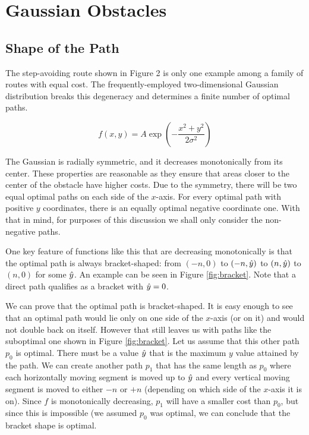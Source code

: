 \section{Gaussian Obstacles}
\subsection{Shape of the Path}
The step-avoiding route shown in Figure 2 is only one example among a family of routes with equal cost. The frequently-employed two-dimensional Gaussian distribution 
breaks this degeneracy and determines a finite number of optimal paths.


\begin{equation}
f(x, y) = A \exp\left(-\displaystyle\frac{x^2+y^2}{2\sigma^2}\right)
\end{equation}

The Gaussian is radially symmetric, and it decreases monotonically from its center. These properties are reasonable as they ensure that areas closer to the center of the obstacle have higher costs. Due to the symmetry, there will be two equal optimal paths on each side of the $x$-axis. For every optimal path with positive $y$ coordinates, there is an equally optimal negative coordinate one. With that in mind, for purposes of this discussion we shall only consider the non-negative paths. 

One key feature of functions like this that are decreasing monotonically is that the optimal path is always bracket-shaped: from $(-n,0)$ to $(-n, \hat{y})$ to $(n, \hat{y})$ to $(n,0)$ for some $\hat{y}$. An example can be seen in Figure \ref{fig:bracket}. Note that a direct path qualifies as a bracket with $\hat{y}=0$.

We can prove that the optimal path is bracket-shaped. It is easy enough to see that an optimal path would lie only on one side of the $x$-axis (or on it) and would not double back on itself. However that still leaves us with paths like the suboptimal one shown in Figure \ref{fig:bracket}. Let us assume that this other path $p_0$ is optimal. There must be a value $\hat{y}$ that is the maximum $y$ value attained by the path. We can create another path $p_1$ that has the same length as $p_0$ where each horizontally moving segment is moved up to $\hat{y}$ and every vertical moving segment is moved to either $-n$ or $+n$ (depending on which side of the $x$-axis it is on). Since $f$ is monotonically decreasing, $p_1$ will have a smaller cost than $p_0$, but since this is impossible (we assumed $p_0$ was optimal, we can conclude that the bracket shape is optimal.  

